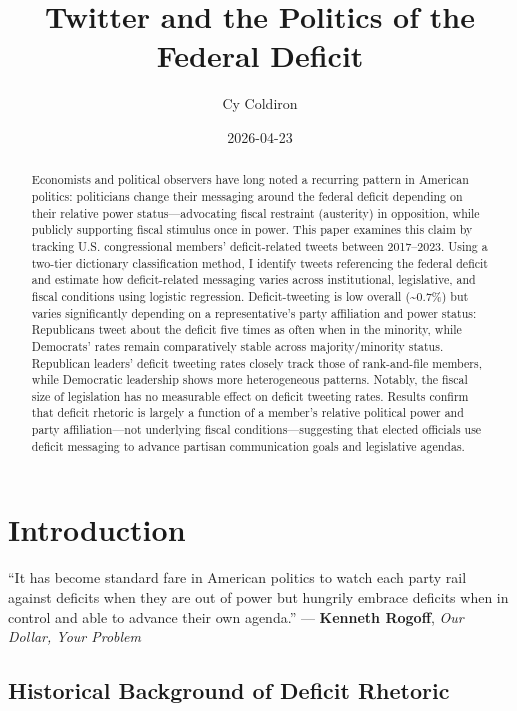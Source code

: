 \documentclass[
  12pt,
]{article}
\title{Twitter and the Politics of the Federal Deficit}
\author{Cy Coldiron}
\date{2026-04-23}
\begin{document}
\maketitle
\begin{abstract}
Economists and political observers have long noted a recurring pattern
in American politics: politicians change their messaging around the
federal deficit depending on their relative power status---advocating
fiscal restraint (austerity) in opposition, while publicly supporting
fiscal stimulus once in power. This paper examines this claim by
tracking U.S. congressional members' deficit-related tweets between
2017--2023. Using a two-tier dictionary classification method, I
identify tweets referencing the federal deficit and estimate how
deficit-related messaging varies across institutional, legislative, and
fiscal conditions using logistic regression. Deficit-tweeting is low
overall (\textasciitilde0.7\%) but varies significantly depending on a
representative's party affiliation and power status: Republicans tweet
about the deficit five times as often when in the minority, while
Democrats' rates remain comparatively stable across majority/minority
status. Republican leaders' deficit tweeting rates closely track those
of rank-and-file members, while Democratic leadership shows more
heterogeneous patterns. Notably, the fiscal size of legislation has no
measurable effect on deficit tweeting rates. Results confirm that
deficit rhetoric is largely a function of a member's relative political
power and party affiliation---not underlying fiscal
conditions---suggesting that elected officials use deficit messaging to
advance partisan communication goals and legislative agendas.
\end{abstract}


\section{Introduction}\label{introduction}

``It has become standard fare in American politics to watch each party
rail against deficits when they are out of power but hungrily embrace
deficits when in control and able to advance their own agenda.'' ---
\textbf{Kenneth Rogoff}, \emph{Our Dollar, Your Problem}

\subsection{Historical Background of Deficit
Rhetoric}\label{historical-background-of-deficit-rhetoric}
\end{document}
